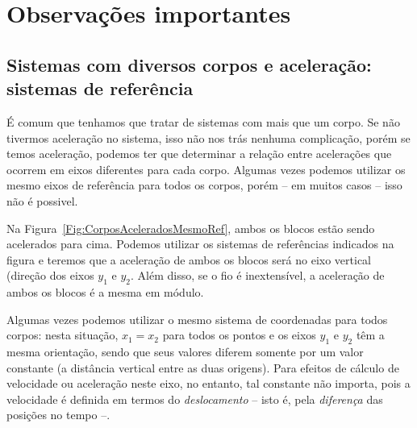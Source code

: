 \section{Observações importantes}

\subsection{Sistemas com diversos corpos e aceleração: sistemas de referência}

É comum que tenhamos que tratar de sistemas com mais que um corpo. Se não tivermos aceleração no sistema, isso não nos trás nenhuma complicação, porém se temos aceleração, podemos ter que determinar a relação entre acelerações que ocorrem em eixos diferentes para cada corpo. Algumas vezes podemos utilizar os mesmo eixos de referência para todos os corpos, porém -- em muitos casos -- isso não é possivel.

Na Figura~\ref{Fig:CorposAceleradosMesmoRef}, ambos os blocos estão sendo acelerados para cima. Podemos utilizar os sistemas de referências indicados na figura e teremos que a aceleração de ambos os blocos será no eixo vertical (direção dos eixos $y_1$ e $y_2$. Além disso, se o fio é inextensível, a aceleração de ambos os blocos é a mesma em módulo. 

\begin{marginfigure}
\centering
{}
\caption{Algumas vezes podemos utilizar o mesmo sistema de coordenadas para todos corpos: nesta situação, $x_1=x_2$ para todos os pontos e os eixos $y_1$ e $y_2$ têm a mesma orientação, sendo que seus valores diferem somente por um valor constante (a distância vertical entre as duas origens). Para efeitos de cálculo de velocidade ou aceleração neste eixo, no entanto, tal constante não importa, pois a velocidade é definida em termos do \emph{deslocamento} -- isto é, pela \emph{diferença} das posições no tempo --.\label{Fig:CorposAceleradosMesmoRef}}
\end{marginfigure}

